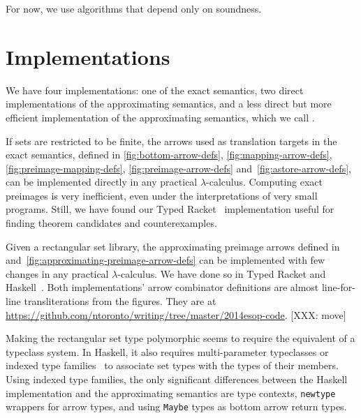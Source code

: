 For now, we use algorithms that depend only on soundness.


\section{Implementations}
\label{sec:implementation}

We have four implementations: one of the exact semantics, two direct implementations of the approximating semantics, and a less direct but more efficient implementation of the approximating semantics, which we call .

If sets are restricted to be finite, the arrows used as translation targets in the exact semantics, defined in \ref{fig:bottom-arrow-defs}, \ref{fig:mapping-arrow-defs}, \ref{fig:preimage-mapping-defs}, \ref{fig:preimage-arrow-defs} and~\ref{fig:astore-arrow-defs}, can be implemented directly in any practical $\lambda$-calculus.
Computing exact preimages is very inefficient, even under the interpretations of very small programs.
Still, we have found our Typed Racket~\cite{cit:tobin-hochstadt-2008popl-typed-scheme} implementation useful for finding theorem candidates and counterexamples.

Given a rectangular set library, the approximating preimage arrows defined in  and~\ref{fig:approximating-preimage-arrow-defs} can be implemented with few changes in any practical $\lambda$-calculus.
We have done so in Typed Racket and Haskell~\cite{cit:haskell-lang}.
Both implementations' arrow combinator definitions are almost line-for-line transliterations from the figures.
They are at \url{https://github.com/ntoronto/writing/tree/master/2014esop-code}. [XXX: move]

Making the rectangular set type polymorphic seems to require the equivalent of a typeclass system.
In Haskell, it also requires multi-parameter typeclasses or indexed type families~\cite{cit:chakravarty-2005popl-type-families} to associate set types with the types of their members.
Using indexed type families, the only significant differences between the Haskell implementation and the approximating semantics are type contexts, \texttt{newtype} wrappers for arrow types, and using \texttt{Maybe} types as bottom arrow return types.

